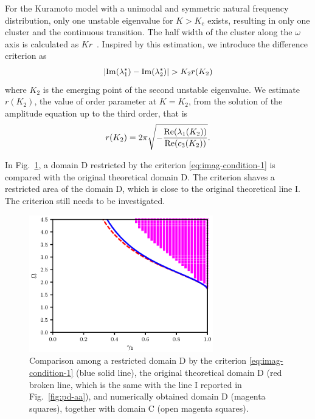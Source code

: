  For the Kuramoto model with a unimodal and symmetric
  natural frequency distribution,
  only one unstable eigenvalue for $K>K_{\mathrm{c}}$ exists,
  resulting in only one cluster and the continuous transition.
  The half width of the cluster along the $\omega$ axis
  is calculated as $Kr$~\cite{strogatz2000}.
  Inspired by %
  this estimation, we introduce the difference criterion as
  \begin{align}
    |{\rm Im}(\lambda_{1}^{\ast})-{\rm Im}(\lambda_{2}^{\ast})|>K_{2}r(K_{2})
    \label{eq:imag-condition-1}
  \end{align}
  where $K_{2}$ is the emerging point of the second unstable eigenvalue.
  We estimate $r(K_{2})$, the value of order parameter at $K=K_{2}$,
  from the solution of the amplitude equation up to the third order, that is
  \begin{align}
    r(K_{2})=2\pi\sqrt{-\frac{{\rm Re}(\lambda_{1}(K_{2}))}{{\rm Re}(c_{3}(K_{2}))}}.
  \end{align}

  In Fig.~\ref{fig:imag-condition},
  a domain D restricted by the criterion \eqref{eq:imag-condition-1}
  is compared with the original theoretical domain D.
  The criterion shaves a restricted area of the domain D,
  which is close to the original theoretical line I.
  The criterion still needs to be investigated.

\begin{figure}
  \includegraphics[width=8cm]{figs/imag-condition.eps}
  \caption{
      Comparison among a restricted domain D by the criterion
      \eqref{eq:imag-condition-1} (blue solid line),
      the original theoretical domain D (red broken line,
      which is the same with the line I reported in Fig.~\ref{fig:pd-aa}),
      and numerically obtained domain D (magenta squares),
      together with domain C (open magenta squares).
  }
  \label{fig:imag-condition}
\end{figure}


